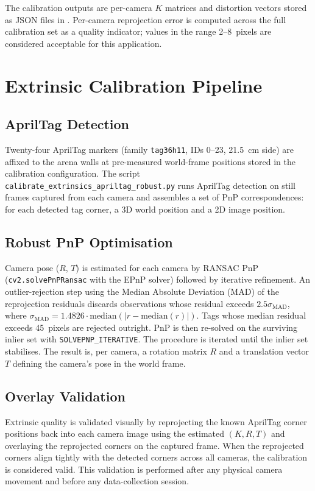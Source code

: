 The calibration outputs are per-camera $K$ matrices and distortion vectors stored as JSON files in . Per-camera reprojection error is computed across the full calibration set as a quality indicator; values in the range 2--8~pixels are considered acceptable for this application.

\section{Extrinsic Calibration Pipeline}

\subsection{AprilTag Detection}

Twenty-four AprilTag markers (family \texttt{tag36h11}, IDs 0--23, 21.5~cm side) are affixed to the arena walls at pre-measured world-frame positions stored in the calibration configuration. The script \texttt{calibrate\_extrinsics\_apriltag\_robust.py} runs AprilTag detection on still frames captured from each camera and assembles a set of PnP correspondences: for each detected tag corner, a 3D world position and a 2D image position.

\subsection{Robust PnP Optimisation}

Camera pose ($R$, $T$) is estimated for each camera by RANSAC PnP (\texttt{cv2.solvePnPRansac} with the EPnP solver) followed by iterative refinement. An outlier-rejection step using the Median Absolute Deviation (MAD) of the reprojection residuals discards observations whose residual exceeds $2.5\sigma_{\text{MAD}}$, where $\sigma_{\text{MAD}} = 1.4826 \cdot \mathrm{median}(|r - \mathrm{median}(r)|)$. Tags whose median residual exceeds 45~pixels are rejected outright. PnP is then re-solved on the surviving inlier set with \texttt{SOLVEPNP\_ITERATIVE}. The procedure is iterated until the inlier set stabilises. The result is, per camera, a rotation matrix $R$ and a translation vector $T$ defining the camera's pose in the world frame.

\subsection{Overlay Validation}

Extrinsic quality is validated visually by reprojecting the known AprilTag corner positions back into each camera image using the estimated $(K, R, T)$ and overlaying the reprojected corners on the captured frame. When the reprojected corners align tightly with the detected corners across all cameras, the calibration is considered valid. This validation is performed after any physical camera movement and before any data-collection session.

